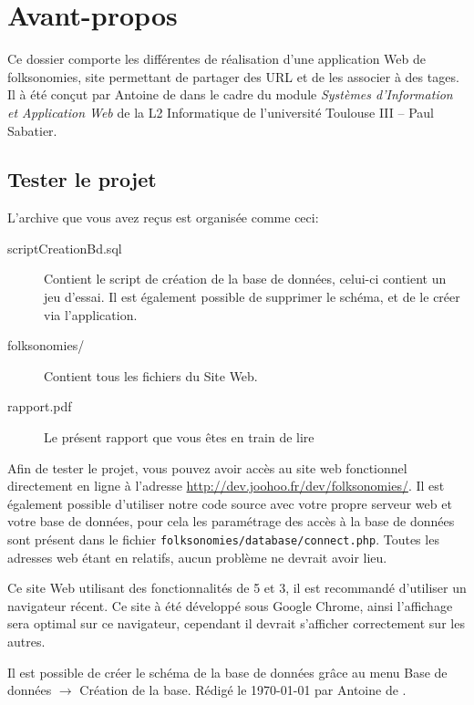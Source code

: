 \documentclass[12pt,a4paper,openany]{book}
\let\pagebreakORIG\pagebreak
\let\clearpageORIG\clearpage
\let\cleardoublepageORIG\cleardoublepage
\newcommand{\removepagebreak}{\renewcommand{\pagebreak}{}\renewcommand{\clearpage}{}\renewcommand{\cleardoublepage}{}}
\newcommand{\restorepagebreak}{\renewcommand{\pagebreak}{\pagebreakORIG}\renewcommand{\clearpage}{\clearpageORIG}\renewcommand{\cleardoublepage}{\cleardoublepageORIG}}
\begin{document}
	\setcounter{tocdepth}{2}
	\setcounter{secnumdepth}{3}
	\removepagebreak
	\maketitle
	\newpage
	\chapter*{Avant-propos}
	Ce dossier comporte les différentes de réalisation d'une application Web de folksonomies, site permettant de partager des URL et
	de les associer à des tages.  
	Il à été conçut par Antoine de  dans le cadre du module \textit{Systèmes d'Information et Application Web} de la L2 Informatique de l'université Toulouse III -- Paul Sabatier.

	\section*{Tester le projet}
	L'archive que vous avez reçus est organisée comme ceci: 
	\begin{description}
		\item[scriptCreationBd.sql] Contient le script de création de la base de données, celui-ci contient un jeu d'essai. Il est
			également possible de supprimer le schéma, et de le créer via l'application. 
		\item[folksonomies/] Contient tous les fichiers du Site Web. 
		\item[rapport.pdf] Le présent rapport que vous êtes en train de lire
	\end{description}

	Afin de tester le projet, vous pouvez avoir accès au site web fonctionnel directement en ligne à l'adresse
	\url{http://dev.joohoo.fr/dev/folksonomies/}. 
	Il est également possible d'utiliser notre code source avec votre propre serveur web et votre base de données, pour cela les paramétrage des accès à la base de données 
	sont présent dans le fichier \texttt{folksonomies/database/connect.php}. Toutes les adresses web étant en relatifs, aucun problème ne devrait avoir lieu.

	Ce site Web utilisant des fonctionnalités de 5 et 3, il est recommandé d'utiliser un navigateur récent. Ce site à été développé sous
	Google Chrome, ainsi l'affichage sera optimal sur ce navigateur, cependant il devrait s'afficher correctement sur les autres.

	Il est possible de créer le schéma de la base de données grâce au menu Base de données $\rightarrow$ Création de la base.
	\vfill
	\footnotesize Rédigé le \today{} par Antoine de .
	\restorepagebreak
	\tableofcontents
\end{document}
